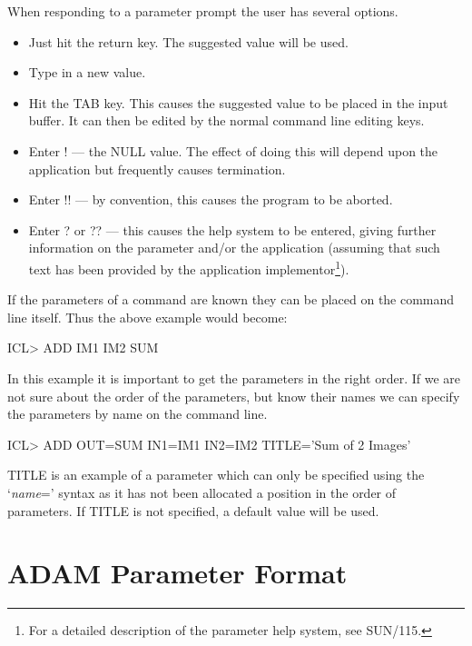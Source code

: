 \documentclass[twoside,11pt,nolof,chapters]{starlink}
\begin{document}
When responding to a parameter prompt the user has several options.
\begin{itemize}

\item Just hit the return key. The suggested value will be used.

\item Type in a new value.

\item Hit the TAB key. This causes the suggested value to be placed in the
input buffer. It can then be edited by the normal command line editing keys.

\item Enter ! --- the NULL value. The effect of doing this will depend upon
the application but frequently causes termination.

\item Enter !! --- by convention, this causes the program to be aborted.

\item Enter ? or ?? --- this causes the help system to be entered,
giving further information on the parameter and/or the application
(assuming that such text has been provided by the application
implementor\footnote{For a detailed description of the parameter help system,
see SUN/115.}).
\end{itemize}

If the parameters of a command are known they can be placed on the command
line itself. Thus the above example would become:

\begin{terminalv}
    ICL> ADD IM1 IM2 SUM
\end{terminalv}

In this example it is important to get the parameters in the right order.
If we are not sure about the order of the parameters, but know their names
we can specify the parameters by name on the command line.

\begin{terminalv}
    ICL> ADD OUT=SUM IN1=IM1 IN2=IM2 TITLE='Sum of 2 Images'
\end{terminalv}

TITLE is an example of a parameter which can only be specified using the
`\emph{name}\/=' syntax as it has not been allocated a position in the order of
parameters.
If TITLE is not specified, a default value will be used.

\section{ADAM Parameter Format}
\end{document}
